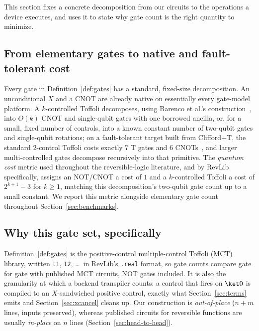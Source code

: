\documentclass[conference]{IEEEtran}
\theoremstyle{plain}
\begin{document}
This section fixes a concrete decomposition from our circuits to the
operations a device executes, and uses it to state why gate count is the
right quantity to minimize.

\subsection{From elementary gates to native and fault-tolerant cost}
Every gate in Definition~\ref{def:gates} has a standard, fixed-size
decomposition. An unconditional $X$ and a CNOT are already native on
essentially every gate-model platform. A $k$-controlled Toffoli
decomposes, using Barenco et al.'s construction~\cite{barenco1995}, into
$O(k)$ CNOT and single-qubit gates with one borrowed ancilla, or, for a
small, fixed number of controls, into a known constant number of
two-qubit gates and single-qubit rotations; on a fault-tolerant target
built from Clifford+T, the standard $2$-control Toffoli costs exactly $7$
T gates and $6$ CNOTs~\cite{barenco1995,nielsen2000}, and larger
multi-controlled gates decompose recursively into that primitive. The
\emph{quantum cost} metric used throughout the reversible-logic
literature, and by RevLib~\cite{revlib2008} specifically, assigns an
NOT/CNOT a cost of $1$ and a $k$-controlled Toffoli a cost of
$2^{k+1}-3$ for $k\ge 1$, matching this decomposition's two-qubit gate
count up to a small constant. We report this metric alongside
elementary gate count throughout Section~\ref{sec:benchmarks}.

\subsection{Why this gate set, specifically}
Definition~\ref{def:gates} is the positive-control multiple-control
Toffoli (MCT) library, written \texttt{t1}, \texttt{t2}, \dots\ in
RevLib's \texttt{.real} format, so gate counts compare gate for gate with
published MCT circuits, NOT gates included. It is also the granularity at
which a backend transpiler counts: a control that fires on $\ket 0$ is
compiled to an $X$-sandwiched positive control, exactly what
Section~\ref{sec:terms} emits and Section~\ref{sec:xcancel} cleans up.
Our construction is \emph{out-of-place} ($n+m$ lines, inputs preserved),
whereas published circuits for reversible functions are usually
\emph{in-place} on $n$ lines (Section~\ref{sec:head-to-head}).
\end{document}
